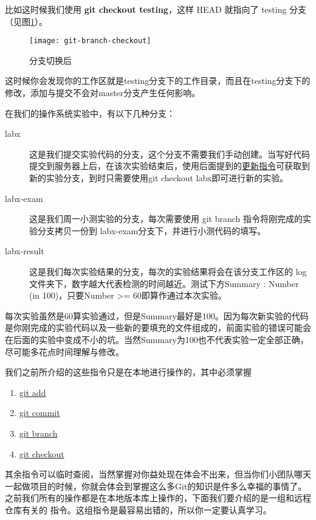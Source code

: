 比如这时候我们使用 \textbf{git checkout testing}，这样 HEAD 就指向了 testing 分支（见图\ref{git-branch-checkout}）。

\begin{figure}[htbp]
  \centering
  \texttt{[image: git-branch-checkout]}
  \caption{分支切换后}\label{git-branch-checkout}
\end{figure}

这时候你会发现你的工作区就是testing分支下的工作目录，而且在testing分支下的修改，添加与提交不会对master分支产生任何影响。

在我们的操作系统实验中，有以下几种分支：
\begin{description}
\item[labx] 这是我们提交实验代码的分支，这个分支不需要我们手动创建。当写好代码提交到服务器上后，在该次实验结束后，使用后面提到的\hyperref[更新指令]{更新指令}可获取到新的实验分支，到时只需要使用git checkout labx即可进行新的实验。
\item[labx-exam] 这是我们周一小测实验的分支，每次需要使用 git branch 指令将刚完成的实验分支拷贝一份到 labx-exam分支下，并进行小测代码的填写。
\item[labx-result] 这是我们每次实验结果的分支，每次的实验结果将会在该分支工作区的 log 文件夹下，数字越大代表检测的时间越近。测试下方Summary : Number (in 100)，只要Number >= 60即算作通过本次实验。
\end{description}

\begin{note}
每次实验虽然是60算实验通过，但是Summary最好是100。因为每次新实验的代码是你刚完成的实验代码以及一些新的要填充的文件组成的，前面实验的错误可能会在后面的实验中变成不小的坑。当然Summary为100也不代表实验一定全部正确，尽可能多花点时间理解与修改。
\end{note}

我们之前所介绍的这些指令只是在本地进行操作的，其中必须掌握

\begin{enumerate}
  \item \hyperref[git add]{git add}
  \item \hyperref[git commit]{git commit}
  \item \hyperref[git branch]{git branch}
  \item \hyperref[git checkout]{git checkout}
\end{enumerate}

其余指令可以临时查阅，当然掌握对你益处现在体会不出来，但当你们小团队哪天一起做项目的时候，你就会体会到掌握这么多Git的知识是件多么幸福的事情了。之前我们所有的操作都是在本地版本库上操作的，下面我们要介绍的是一组和远程仓库有关的
指令。这组指令是最容易出错的，所以你一定要认真学习。

